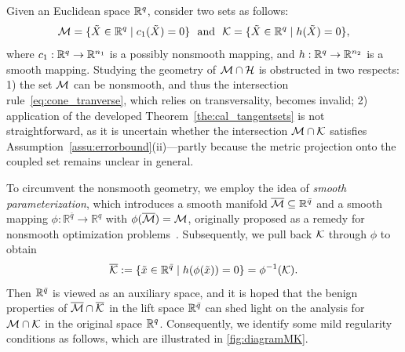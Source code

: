 Given an Euclidean space $\mathbb{R}^q$, consider two sets as follows: 
\begin{equation}\label{eq:def_MK}
    \manifold=\{\tilde{X}\in\mbR^q \mid c_1(\tilde{X})=0\}\ \ \text{and}\ \ \kanifold=\{\tilde{X}\in\mbR^q\mid h(\tilde{X})=0\},
\end{equation}
where $c_1:\mathbb{R}^q\to\mathbb{R}^{n_1}$ is a possibly nonsmooth mapping, and $h:\mathbb{R}^q\to\mathbb{R}^{n_2}$ is a smooth mapping. Studying the geometry of $\mathcal{M}\cap\mathcal{H}$ is obstructed in two respects: 1) the set $\mathcal{M}$ can be nonsmooth, and thus the intersection rule~\eqref{eq:cone_tranverse}, which relies on transversality, becomes invalid; 2) application of the developed Theorem~\ref{the:cal_tangentsets} is not straightforward, as it is uncertain whether the intersection $\mathcal{M}\cap\mathcal{K}$ satisfies Assumption~\ref{assu:errorbound}(ii)---partly because the metric projection onto the coupled set remains unclear in general.

To circumvent the nonsmooth geometry, we employ the idea of \emph{smooth parameterization}, which introduces a smooth manifold $\overline{\mathcal{M}}\subseteq\mathbb{R}^{\bar q}$ and a smooth mapping $\phi:\mathbb{R}^{\bar q}\to\mathbb{R}^{q}$ with $\phi(\overline{\mathcal{M}})=\mathcal{M}$, originally proposed as a remedy for nonsmooth optimization problems~\cite{levin2023remedy,levin2025effect}. Subsequently, we pull back $\mathcal{K}$ through $\phi$ to obtain
\[\overline{\mathcal{K}}:=\{\tilde{x}\in\mathbb{R}^{\bar{q}}\mid h(\phi(\tilde{x}))=0\}=\phi^{-1}(\mathcal{K}).\]
Then $\mathbb{R}^{\bar{q}}$ is viewed as an auxiliary space, and it is hoped that the benign properties of $\overline{\mathcal{M}}\cap\overline{\mathcal{K}}$ in the lift space $\mathbb{R}^{\bar{q}}$ can shed light on the analysis for $\mathcal{M}\cap\mathcal{K}$ in the original space $\mathbb{R}^q$. Consequently, we identify some mild regularity conditions as follows, which are illustrated in \myfig\ref{fig:diagramMK}.

